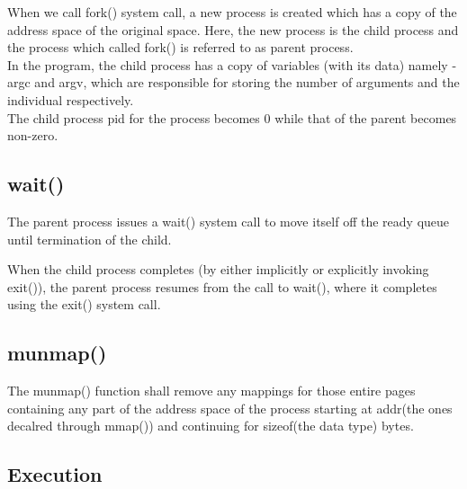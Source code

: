 \documentclass[12pt]{article}
\begin{document}
When we call fork() system call, a new process is created which has a copy of the address space of the original space. Here, the new process is the child process and the process which called fork() is referred to as parent process. \\

In the program, the child process has a copy of variables (with its data) namely -  argc and argv, which are responsible for storing the number of arguments and the individual respectively. \\

The child process pid for the process becomes 0 while that of the parent becomes non-zero.

\subsection{wait()}
The parent process issues a wait() system call to move itself off the ready queue until termination of the child.

When the child process completes (by either implicitly or explicitly invoking exit()), the parent process resumes from the call to wait(), where it completes using the exit() system call. 

\subsection{munmap()}

The munmap() function shall remove any mappings for those entire pages containing any part of the address space of the process starting at addr(the ones decalred through mmap()) and continuing for sizeof(the data type) bytes.

\subsection{Execution}
\end{document}
